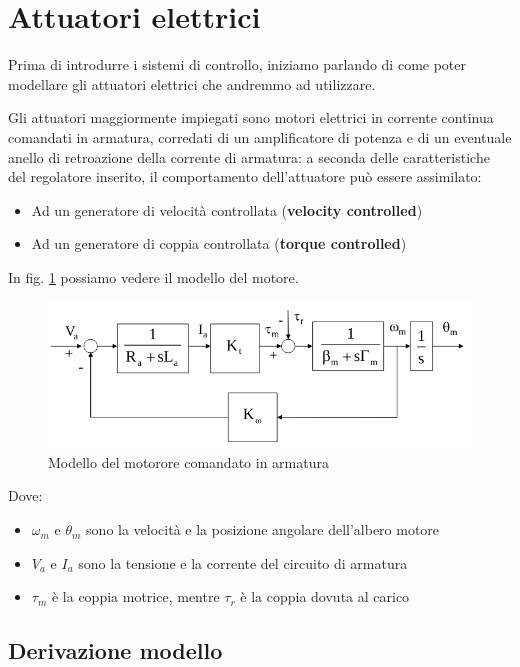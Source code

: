 \section{Attuatori elettrici}
Prima di introdurre i sistemi di controllo, iniziamo parlando di come poter modellare gli attuatori elettrici che andremmo ad utilizzare.

Gli attuatori maggiormente impiegati sono motori elettrici in corrente continua comandati in armatura, corredati di un amplificatore di potenza e di un eventuale anello di retroazione della corrente di armatura: a seconda delle caratteristiche del regolatore inserito, il comportamento dell’attuatore può essere assimilato:
\begin{itemize}
	\item Ad un generatore di velocità controllata (\textbf{velocity controlled})
	\item Ad un generatore di coppia controllata (\textbf{torque controlled})
\end{itemize}

In fig. \ref{fig:electricactuator1} possiamo vedere il modello del motore.

\begin{figure}[th!]
	\centering
	\includegraphics[width=0.7\linewidth]{images/electric_actuator_1}
	\caption{Modello del motorore comandato in armatura}
	\label{fig:electricactuator1}
\end{figure}

Dove:
\begin{itemize}
	\item $\omega_m$ e $\theta_m$ sono la velocità e la posizione angolare dell’albero
	motore
	\item $V_a$ e $I_a$ sono la tensione e la corrente del circuito di armatura
	\item $\tau_m$ è la coppia motrice, mentre $\tau_r$ è la coppia dovuta al carico
\end{itemize}


\subsection{Derivazione modello}

